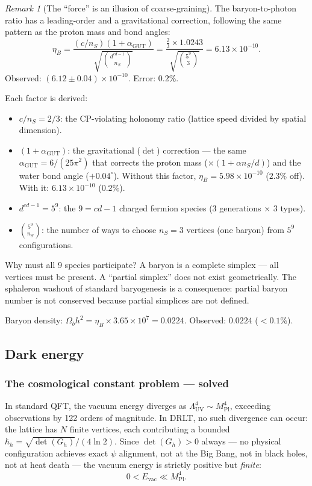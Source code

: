 \documentclass[12pt]{article}
\theoremstyle{remark}
\newtheorem{remark}[theorem]{Remark}
\theoremstyle{definition}
\begin{document}
\begin{remark}[The ``force'' is an illusion of coarse-graining]
The baryon-to-photon ratio has a leading-order and a gravitational correction, following the same pattern as the proton mass and bond angles:
\begin{equation}
\eta_B = \frac{(c/n_S)(1 + \alpha_\text{GUT})}{\sqrt{\binom{d^{cd-1}}{n_S}}} = \frac{\frac{2}{3} \times 1.0243}{\sqrt{\binom{5^9}{3}}} = 6.13 \times 10^{-10}.
\end{equation}
Observed: $(6.12 \pm 0.04) \times 10^{-10}$. Error: $0.2\%$.

Each factor is derived:
\begin{itemize}
\item $c/n_S = 2/3$: the CP-violating holonomy ratio (lattice speed divided by spatial dimension).
\item $(1 + \alpha_\text{GUT})$: the gravitational ($\det$) correction --- the same $\alpha_\text{GUT} = 6/(25\pi^2)$ that corrects the proton mass ($\times(1 + \alpha n_S/d)$) and the water bond angle ($+0.04^\circ$). Without this factor, $\eta_B = 5.98 \times 10^{-10}$ ($2.3\%$ off). With it: $6.13 \times 10^{-10}$ ($0.2\%$).
\item $d^{cd-1} = 5^9$: the $9 = cd - 1$ charged fermion species ($3$ generations $\times$ $3$ types).
\item $\binom{5^9}{n_S}$: the number of ways to choose $n_S = 3$ vertices (one baryon) from $5^9$ configurations.
\end{itemize}

Why must all 9 species participate? A baryon is a complete simplex --- all vertices must be present. A ``partial simplex'' does not exist geometrically. The sphaleron washout of standard baryogenesis is a consequence: partial baryon number is not conserved because partial simplices are not defined.

Baryon density: $\Omega_b h^2 = \eta_B \times 3.65 \times 10^7 = 0.0224$. Observed: $0.0224$ ($< 0.1\%$).

\subsection{Dark energy}

\subsubsection{The cosmological constant problem --- solved}

In standard QFT, the vacuum energy diverges as $\Lambda^4_\text{UV} \sim M_\text{Pl}^4$, exceeding observations by 122 orders of magnitude. In DRLT, no such divergence can occur: the lattice has $N$ finite vertices, each contributing a bounded $\hbar_h = \sqrt{\det(G_h)}/(4\ln 2)$. Since $\det(G_h) > 0$ always --- no physical configuration achieves exact $\psi$ alignment, not at the Big Bang, not in black holes, not at heat death --- the vacuum energy is strictly positive but \emph{finite}:
\begin{equation}
0 < E_\text{vac} \ll M_\text{Pl}^4.
\end{equation}


\end{remark}
\end{document}
